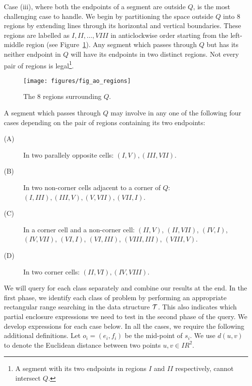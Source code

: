 Case (iii), where both the endpoints of a segment are outside $Q$, 
is the most challenging case to handle. We begin by partitioning the 
space outside $Q$ into 8 regions by extending lines through its 
horizontal and vertical boundaries. These regions are labelled as 
$I, II, \ldots, VIII$ in anticlockwise order starting from the 
left-middle region (see Figure~\ref{fig:rectangles:ao:regions}). Any 
segment which passes through $Q$ but has its neither endpoint in $Q$ 
will have its endpoints in two distinct regions. Not every pair of 
regions is legal\footnote{A segment with its two endpoints 
in regions $I$ and $II$ respectively, cannot intersect $Q$.}.

\begin{figure}[t]
\begin{center}
  \texttt{[image: figures/fig\_ao\_regions]}
  \caption{The 8 regions surrounding $Q$.}
  \label{fig:rectangles:ao:regions}
\end{center}
\end{figure}

A segment which passes through $Q$ may involve in any one of the following 
four cases depending on the pair of regions containing its two endpoints:

\begin{description}
\item[(A)] In two parallely opposite cells: $(I, V), (III, VII)$.
\item[(B)] In two non-corner cells adjacent to a corner of $Q$: $(I, III), (III, V), (V,VII), (VII, I)$.
\item[(C)] In a corner cell and a non-corner cell: $(II, V)$, $(II, VII)$, $(IV, I)$, 
$(IV, VII)$, $(VI, I)$, \newline $(VI, III)$, $(VIII, III)$, $(VIII, V)$.
\item[(D)] In two corner cells: $(II, VI), (IV, VIII)$.
\end{description}

We will query for each class separately and combine our results at the end. 
In the first phase, we identify each class of problem 
by performing an appropriate rectangular range searching in the 
data structure $\cal T$. 
This also indicates which partial enclosure expressions we need to test in 
the second phase of the query. We develop expressions for each case below. 
In all the cases, we require the following additional definitions. Let 
$o_i = (e_i, f_i)$ be the mid-point of $s_i$. We use  
$d(u,v)$ to denote the Euclidean distance between two points $u,v \in 
I\!\!R^2$. 

